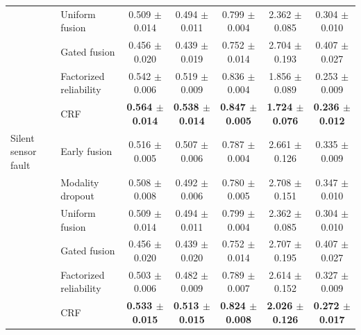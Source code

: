 \begin{tabular}{llccccc}
 & Uniform fusion & 0.509 $\pm$ 0.014 & 0.494 $\pm$ 0.011 & 0.799 $\pm$ 0.004 & 2.362 $\pm$ 0.085 & 0.304 $\pm$ 0.010 \\
 & Gated fusion & 0.456 $\pm$ 0.020 & 0.439 $\pm$ 0.019 & 0.752 $\pm$ 0.014 & 2.704 $\pm$ 0.193 & 0.407 $\pm$ 0.027 \\
 & Factorized reliability & 0.542 $\pm$ 0.006 & 0.519 $\pm$ 0.009 & 0.836 $\pm$ 0.004 & 1.856 $\pm$ 0.089 & 0.253 $\pm$ 0.009 \\
 & CRF & \textbf{0.564 $\pm$ 0.014} & \textbf{0.538 $\pm$ 0.014} & \textbf{0.847 $\pm$ 0.005} & \textbf{1.724 $\pm$ 0.076} & \textbf{0.236 $\pm$ 0.012} \\
\addlinespace
Silent sensor fault & Early fusion & 0.516 $\pm$ 0.005 & 0.507 $\pm$ 0.006 & 0.787 $\pm$ 0.004 & 2.661 $\pm$ 0.126 & 0.335 $\pm$ 0.009 \\
 & Modality dropout & 0.508 $\pm$ 0.008 & 0.492 $\pm$ 0.006 & 0.780 $\pm$ 0.005 & 2.708 $\pm$ 0.151 & 0.347 $\pm$ 0.010 \\
 & Uniform fusion & 0.509 $\pm$ 0.014 & 0.494 $\pm$ 0.011 & 0.799 $\pm$ 0.004 & 2.362 $\pm$ 0.085 & 0.304 $\pm$ 0.010 \\
 & Gated fusion & 0.456 $\pm$ 0.020 & 0.439 $\pm$ 0.020 & 0.752 $\pm$ 0.014 & 2.707 $\pm$ 0.195 & 0.407 $\pm$ 0.027 \\
 & Factorized reliability & 0.503 $\pm$ 0.006 & 0.482 $\pm$ 0.009 & 0.789 $\pm$ 0.007 & 2.614 $\pm$ 0.152 & 0.327 $\pm$ 0.009 \\
 & CRF & \textbf{0.533 $\pm$ 0.015} & \textbf{0.513 $\pm$ 0.015} & \textbf{0.824 $\pm$ 0.008} & \textbf{2.026 $\pm$ 0.126} & \textbf{0.272 $\pm$ 0.017} \\
\bottomrule
\end{tabular}